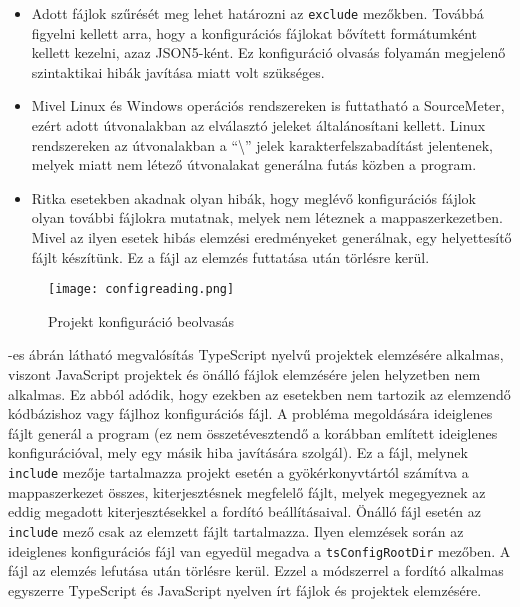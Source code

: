 \begin{itemize}
    \item Adott fájlok szűrését meg lehet határozni az \texttt{exclude} mezőkben. Továbbá figyelni kellett arra, hogy a konfigurációs fájlokat bővített formátumként kellett kezelni, azaz JSON5-ként. Ez konfiguráció olvasás folyamán megjelenő szintaktikai hibák javítása miatt volt szükséges.
    \item Mivel Linux és Windows operációs rendszereken is futtatható a SourceMeter, ezért adott útvonalakban az elválasztó jeleket általánosítani kellett. Linux rendszereken az útvonalakban a ``\textbackslash'' jelek karakterfelszabadítást jelentenek, melyek miatt nem létező útvonalakat generálna futás közben a program.
    \item Ritka esetekben akadnak olyan hibák, hogy meglévő konfigurációs fájlok olyan további fájlokra mutatnak, melyek nem léteznek a mappaszerkezetben. Mivel az ilyen esetek hibás elemzési eredményeket generálnak, egy helyettesítő fájlt készítünk. Ez a fájl az elemzés futtatása után törlésre kerül.
\end{itemize} 

\begin{figure}[!htbp]
    \caption{Projekt konfiguráció beolvasás}\label{fig:projconfig}
    \centering
    \texttt{[image: configreading.png]}
\end{figure}

\noindent

-es ábrán látható megvalósítás TypeScript nyelvű projektek elemzésére alkalmas, viszont JavaScript projektek és önálló fájlok elemzésére jelen helyzetben nem alkalmas. Ez abból adódik, hogy ezekben az esetekben nem tartozik az elemzendő kódbázishoz vagy fájlhoz konfigurációs fájl. A probléma megoldására ideiglenes fájlt generál a program (ez nem összetévesztendő a korábban említett ideiglenes konfigurációval, mely egy másik hiba javítására szolgál). Ez a fájl, melynek \texttt{include} mezője tartalmazza projekt esetén a gyökérkonyvtártól számítva a mappaszerkezet összes, kiterjesztésnek megfelelő fájlt, melyek megegyeznek az eddig megadott kiterjesztésekkel a fordító beállításaival. Önálló fájl esetén az \texttt{include} mező csak az elemzett fájlt tartalmazza.
Ilyen elemzések során az ideiglenes konfigurációs fájl van egyedül megadva a \texttt{tsConfigRootDir} mezőben. A fájl az elemzés lefutása után törlésre kerül.
Ezzel a módszerrel a fordító alkalmas egyszerre TypeScript és JavaScript nyelven írt fájlok és projektek elemzésére. 


